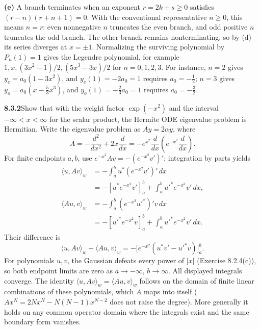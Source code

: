 \textbf{(e)} A branch terminates when an exponent $r=2k+s\ge0$
satisfies $(r-n)(r+n+1)=0$.  With the conventional representative
$n\ge0$, this means $n=r$: even nonnegative $n$ truncates the even
branch, and odd positive $n$ truncates the odd branch.  The other
branch remains nonterminating, so by (d) its series diverges at
$x=\pm1$.
Normalizing the surviving polynomial by $P_n(1)=1$ gives the Legendre
polynomial, for example $1,x,(3x^2-1)/2,(5x^3-3x)/2$ for $n=0,1,2,3$.
For instance, $n=2$ gives $y_e=a_0(1-3x^2)$, and $y_e(1)=-2a_0=1$
requires $a_0=-\frac12$; $n=3$ gives $y_o=a_0(x-\frac53x^3)$, and
$y_o(1)=-\frac23a_0=1$ requires $a_0=-\frac32$.


\par\bigskip
\noindent\textbf{8.3.2}\quad Show that with the weight factor $\exp(-x^{2})$
and the interval $-\infty<x<\infty$ for the scalar product, the Hermite ODE
eigenvalue problem is Hermitian.
\solution
{}
Write the eigenvalue problem as $Ay=2\alpha y$, where
\[
A=-\frac{d^2}{dx^2}+2x\frac{d}{dx}
=-e^{x^2}\frac{d}{dx}\left(e^{-x^2}\frac{d}{dx}\right).
\]
For finite endpoints $a,b$, use $e^{-x^2}Av=-(e^{-x^2}v')'$;
integration by parts yields
\begin{align*}
\langle u,Av\rangle_w
&=-\int_a^b u^*(e^{-x^2}v')'\,dx\\
&=-[u^*e^{-x^2}v']_a^b
  +\int_a^b u'^*e^{-x^2}v'\,dx,\\
\langle Au,v\rangle_w
&=-\int_a^b (e^{-x^2}u'^*)'v\,dx\\
&=-[u'^*e^{-x^2}v]_a^b
  +\int_a^b u'^*e^{-x^2}v'\,dx.
\end{align*}
Their difference is
\[
\langle u,Av\rangle_w-\langle Au,v\rangle_w
=-\bigl[e^{-x^2}(u^*v'-u'^*v)\bigr]_a^b.
\]
For polynomials $u,v$, the Gaussian defeats every power of $|x|$
(Exercise 8.2.4(c)),
so both endpoint limits are zero as $a\to-\infty$, $b\to\infty$.
All displayed integrals converge.  The identity
$\langle u,Av\rangle_w=\langle Au,v\rangle_w$ follows on the
domain of finite linear combinations of these polynomials, which $A$
maps into itself ($Ax^N=2Nx^N-N(N-1)x^{N-2}$ does not raise the
degree).
More generally it holds on any common operator domain where the
integrals exist and the same boundary form vanishes.


